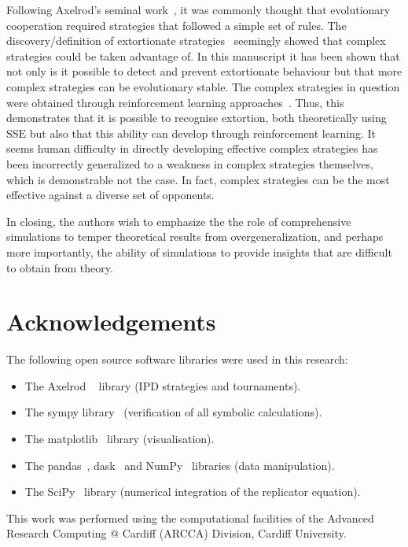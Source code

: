 \documentclass[a4paper]{article}
\newcommand{\SSe}{\text{SSE}}
\begin{document}
Following Axelrod's seminal work~\cite{Axelrod1980, Axelrod1980a}, it was
commonly thought that evolutionary cooperation required strategies that followed
a simple set of rules. The discovery/definition of extortionate
strategies~\cite{Press2012} seemingly showed that complex strategies could be
taken advantage of. In this manuscript it has been shown that not only is it
possible to detect and prevent extortionate behaviour but that more complex
strategies can be evolutionary stable. The complex strategies in question were
obtained through reinforcement learning approaches~\cite{Harper2017, Moran1707}.
Thus, this demonstrates that it is possible to recognise extortion, both
theoretically using \(\SSe\) but also that this ability can develop through
reinforcement learning. It seems human difficulty in directly developing
effective complex strategies has been incorrectly generalized to a weakness
in complex strategies themselves, which is demonstrable not the case. In fact,
complex strategies can be the most effective against a diverse set of opponents.

In closing, the authors wish to emphasize the the role of comprehensive simulations to temper
theoretical results from overgeneralization, and perhaps more importantly, the
ability of simulations to provide insights that are difficult to obtain from theory.

\section*{Acknowledgements}

The following open source software libraries were used in this research:

\begin{itemize}
    \item The Axelrod ~\cite{Knight2016, Knight2018} library (IPD strategies and
        tournaments).
    \item The sympy library~\cite{Meurer2017} (verification of all symbolic
        calculations).
    \item The matplotlib~\cite{Droettboom2018} library (visualisation).
    \item The pandas~\cite{Structures2010}, dask~\cite{Dask2016} and
        NumPy~\cite{Oliphant2015} libraries (data manipulation).
    \item The SciPy~\cite{Jones2001} library (numerical integration of the
        replicator equation).
\end{itemize}

This work was performed using the computational facilities of the Advanced
Research Computing @ Cardiff (ARCCA) Division, Cardiff University.

\printbibliography



\end{document}
